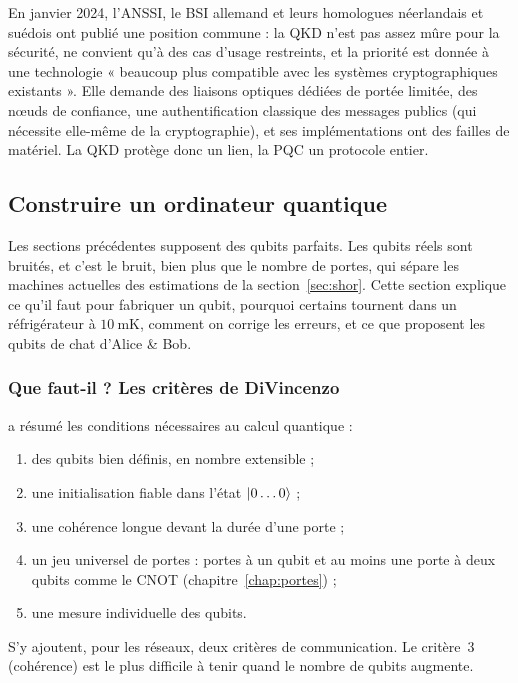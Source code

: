 \begin{remarque}
En janvier 2024, l'ANSSI, le BSI allemand et leurs homologues néerlandais et suédois ont publié une position commune
\parencite{anssi2024qkd} : la QKD n'est pas assez mûre pour la sécurité, ne convient qu'à des cas d'usage restreints, et la priorité est donnée à
une technologie « beaucoup plus compatible avec les systèmes cryptographiques existants ». Elle demande des liaisons optiques
dédiées de portée limitée, des nœuds de confiance, une authentification classique des messages publics (qui nécessite
elle-même de la cryptographie), et ses implémentations ont des failles de matériel. La QKD protège donc un lien, la PQC un
protocole entier.
\end{remarque}

\subsection{Construire un ordinateur quantique}\label{sec:machine}

Les sections précédentes supposent des qubits parfaits. Les qubits réels sont bruités, et c'est le bruit, bien plus que le
nombre de portes, qui sépare les machines actuelles des estimations de la section~\ref{sec:shor}. Cette section
explique ce qu'il faut pour fabriquer un qubit, pourquoi certains tournent dans un réfrigérateur à
$10\ \mathrm{mK}$, comment on corrige les erreurs, et ce que proposent les qubits de chat d'Alice \& Bob.

\subsubsection{Que faut-il ? Les critères de DiVincenzo}

\textcite{divincenzo2000} a résumé les conditions nécessaires au calcul quantique :
\begin{enumerate}[nosep]
  \item des qubits bien définis, en nombre extensible ;
  \item une initialisation fiable dans l'état $|0\ldots0\rangle$ ;
  \item une cohérence longue devant la durée d'une porte ;
  \item un jeu universel de portes : portes à un qubit et au moins une porte à deux qubits comme le CNOT (chapitre~\ref{chap:portes}) ;
  \item une mesure individuelle des qubits.
\end{enumerate}
S'y ajoutent, pour les réseaux, deux critères de communication. Le critère~3 (cohérence) est le plus difficile à tenir quand le nombre de qubits augmente.

